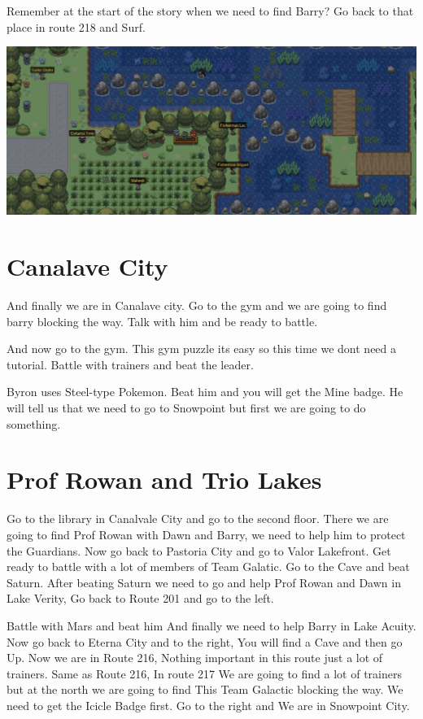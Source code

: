 \documentclass[11pt]{article}
\begin{document}
Remember at the start of the story when we need to find Barry?
Go back to that place in route 218 and Surf.

\includegraphics[width=\textwidth]{walkthrough/Sinnoh/Route_218}

\section{Canalave City}\label{sec:canalave-city}

And finally we are in Canalave city.
Go to the gym and we are going to find barry blocking the way.
Talk with him and be ready to battle.

And now go to the gym.
This gym puzzle its easy so this time we dont need a tutorial.
Battle with trainers and beat the leader.

Byron uses Steel-type Pokemon.
Beat him and you will get the Mine badge.
He will tell us that we need to go to Snowpoint but first we are going to do something.

\section{Prof Rowan and Trio Lakes}\label{sec:prof-rowan-and-trio-lakes}
Go to the library in Canalvale City and go to the second floor.
There we are going to find Prof Rowan with Dawn and Barry,
we need to help him to protect the Guardians.
Now go back to Pastoria City and go to Valor Lakefront.
Get ready to battle with a lot of members of Team Galatic.
Go to the Cave and beat Saturn.
After beating Saturn we need to go and help Prof Rowan and Dawn in Lake Verity, Go back to Route 201 and go to the left.

Battle with Mars and beat him
And finally we need to help Barry in Lake Acuity.
Now go back to Eterna City and to the right, You will find a Cave and then go Up.
Now we are in Route 216, Nothing important in this route just a lot of trainers.
Same as Route 216, In route 217 We are going to find a lot of trainers
but at the north we are going to find This Team Galactic blocking the way.
We need to get the Icicle Badge first.
Go to the right and We are in Snowpoint City.
\end{document}
